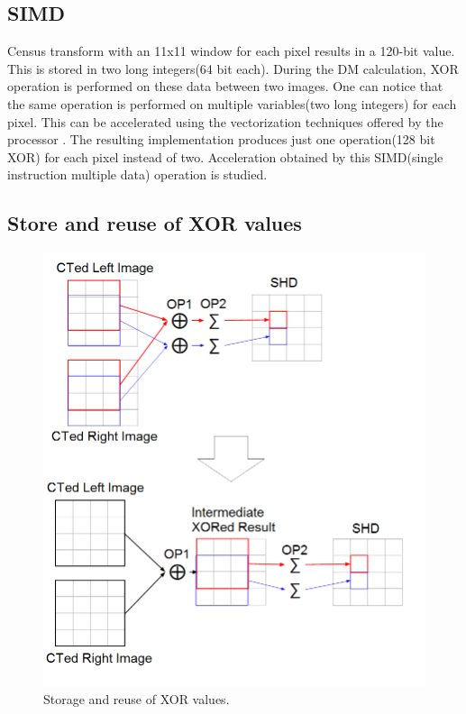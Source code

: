 \subsection{SIMD}
\label{s:optimizations:simd}
Census transform with an 11x11 window for each pixel results in a 120-bit value. This is stored in two long integers(64 bit each). During the DM calculation, XOR operation is performed on these data between two images. One can notice that the same operation is performed on multiple variables(two long integers) for each pixel. This can be accelerated using the vectorization techniques offered by the processor \cite{Siewert2009}. The resulting implementation produces just one operation(128 bit XOR) for each pixel instead of two. Acceleration obtained by this SIMD(single instruction multiple data) operation is studied.

\subsection{Store and reuse of XOR values}
\label{s:optimizations:xoroptimization}

\begin{figure}[!htbp]
    \center
    \includegraphics[width=.8\linewidth]{figures/xoroptimization}
    \caption{Storage and reuse of XOR values.}
    \label{fig:xoroptimization}
\end{figure}

